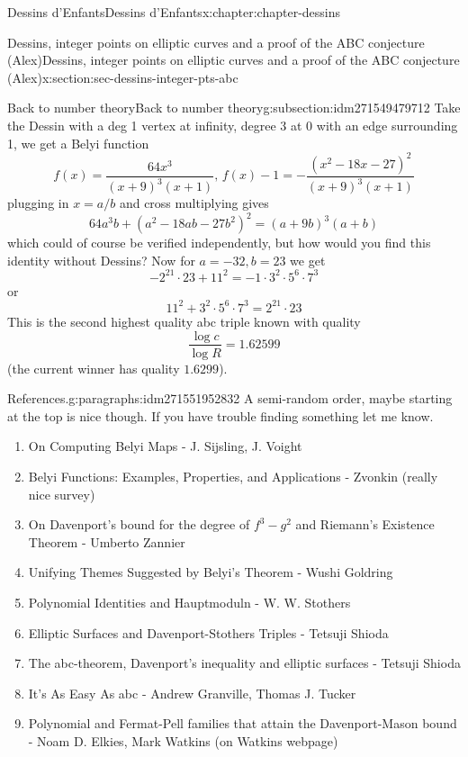 \documentclass[oneside,10pt,]{book}
\numberwithin{equation}{section}
\begin{document}
\begin{chapterptx}{Dessins d'Enfants}{}{Dessins d'Enfants}{}{}{x:chapter:chapter-dessins}
\begin{sectionptx}{Dessins, integer points on elliptic curves and a proof of the ABC conjecture (Alex)}{}{Dessins, integer points on elliptic curves and a proof of the ABC conjecture (Alex)}{}{}{x:section:sec-dessins-integer-pts-abc}
\begin{subsectionptx}{Back to number theory}{}{Back to number theory}{}{}{g:subsection:idm271549479712}
Take the Dessin with a deg 1 vertex at infinity, degree 3 at 0 with an edge surrounding 1, we get a Belyi function%
\begin{equation*}
f(x) = \frac{64x^3}{(x+9)^3 (x+1)},\,f(x) - 1 = -\frac{(x^2 - 18x -27)^2}{(x+9)^3(x+1)}
\end{equation*}
plugging in \(x=a/b\) and cross multiplying gives%
\begin{equation*}
64a^3 b + (a^2 - 18ab - 27b^2)^2 = (a+9b)^3(a+b)
\end{equation*}
which could of course be verified independently, but how would you find this identity without Dessins? Now for \(a = -32, b= 23\) we get%
\begin{equation*}
- 2^{21} \cdot 23 +  11^2 =  -1 \cdot 3^2 \cdot 5^6 \cdot 7^3
\end{equation*}
or%
\begin{equation*}
11^2 + 3^2 \cdot 5^6 \cdot 7^3 = 2^{21} \cdot 23
\end{equation*}
This is the second highest quality abc triple known with quality%
\begin{equation*}
\frac{\log c}{\log R} = 1.62599
\end{equation*}
(the current winner has quality \(1.6299\)).%
\begin{paragraphs}{References.}{g:paragraphs:idm271551952832}%
A semi-random order, maybe starting at the top is nice though. If you have trouble finding something let me know.%
\begin{enumerate}
\item{}On Computing Belyi Maps - J. Sijsling, J. Voight%
\item{}Belyi Functions: Examples, Properties, and Applications - Zvonkin (really nice survey)%
\item{}On Davenport’s bound for the degree of \(f^3 - g^2\) and Riemann's Existence Theorem - Umberto Zannier%
\item{}Unifying Themes Suggested by Belyi's Theorem - Wushi Goldring%
\item{}Polynomial Identities and Hauptmoduln - W. W. Stothers%
\item{}Elliptic Surfaces and Davenport-Stothers Triples -  Tetsuji Shioda%
\item{}The abc-theorem, Davenport’s inequality and elliptic surfaces - Tetsuji Shioda%
\item{}It's As Easy As abc -  Andrew Granville, Thomas J. Tucker%
\item{}Polynomial and Fermat-Pell families that attain the Davenport-Mason bound - Noam D. Elkies, Mark Watkins (on Watkins webpage)%

\end{enumerate}
\end{paragraphs}
\end{subsectionptx}
\end{sectionptx}
\end{chapterptx}
\end{document}
